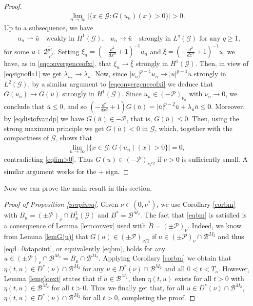 \documentclass[10pt,a4paper]{article}
\theoremstyle{definition} \theoremstyle{remark}
\numberwithin{equation}{section}
\newcommand{\G}{\mathcal{G}}
\newcommand{\B}{\mathcal{B}}
\newcommand{\p}{\mathcal{P}}
\newcommand{\la}{\lambda}
\begin{document}
\begin{proof}
    \begin{align} \label{eqlim>0}
    	\lim_{n \to \infty}|\{x \in \G: G(u_n)(x) > 0\}| > 0.
    \end{align}
    Up to a subsequence, we have 
    \begin{align*}
    	& u_n \rightharpoonup \bar u \quad \text{weakly in } H^1(\G), 
    	& u_n \to \bar u \quad \text{strongly in } L^q(\G) \text{ for any } q \geq 1,
    \end{align*}
    for some $\bar u \in \overline{\B_{\rho^*}^\mu}$. Setting $\xi_n = (-\frac{d^2}{dx^2} + 1)^{-1}u_n$ and $\bar\xi = (-\frac{d^2}{dx^2} + 1)^{-1}\bar u$,  we have, as in  \eqref{eqconvergenceofxi}, that $\xi_n \to \bar \xi$ strongly in $H^1(\G)$. Then, in view of \eqref{eqsignofla1} we get $\la_{u_n} \to \la_{\bar u}$. Now, since $|u_n|^{p-1}u_n \to |u|^{p-1}u$ strongly in $L^2(\G)$, by a similar argument to \eqref{eqconvergenceofxi} we deduce that $G(u_n) \to G(\bar u)$ strongly in $H^1(\G)$. Since $u_n \in (-\p)_{\nu_n}$ with $\nu_n \to 0$, we conclude that $\bar u \leq 0$, and so $(-\frac{d^2}{dx^2} + 1)G(\bar u) = |\bar u|^{p-2}\bar u + \la_{\bar u}\bar u \leq 0$. Moreover, by \eqref{eqdistofvandp} we have $G(\bar u) \in -\p$, that is, $ G(\bar u) \leq 0$. Then, using the strong maximum principle we get $G(\bar u) < 0$ in $\G$, which, together with the compactness of $\G$, shows that
    \begin{align*}
    	\lim_{n \to \infty}|\{x \in \G: G(u_n)(x) > 0\}| = 0,
    \end{align*}
    contradicting \eqref{eqlim>0}. Thus $G(u) \in (-\p)_{\nu/2}$ if $\nu > 0$ is sufficiently small. A similar argument works for the $+$ sign.
\end{proof}

Now we can prove the main result in this section.


\begin{proof}[Proof of Proposition \ref{propinva}]
Given $\nu \in (0,\nu^*)$, we use Corollary \ref{corbm} with $B_\mu = (\pm\p)_\nu \cap H^1_\mu(\G)$ and $B^* = \B^{M_2}$. The fact that \eqref{eqbm} is satisfied is a consequence of Lemma \ref{lemconvex} used with $\tilde{B} = (\pm\p)_\nu$. Indeed, we know from Lemma \ref{lemG(u)} that $G(u) \in (\pm\p)_{\nu/2}$ if $u \in (\pm\p)_\nu \cap \B^{M_2}$ and thus \eqref{eqd=0atapoint}, or equivalently \eqref{eqbm}, holds for any $u \in (\pm\p)_\nu \cap \B^{M_2} = B_{\mu} \cap \B^{M_2}.$  Applying Corollary \ref{corbm} we obtain that  $\eta(t,u) \in D^*(\nu) \cap \B^{M_2}$ for any $u \in D^*(\nu) \cap \B^{M_2}$ and all $0 < t <T_u$. However, Lemma \ref{lemgloext} states that if $u \in \B^{M_2}$, then $\eta(t,u)$ exists for all $t > 0$ with 
$\eta(t,u) \in \B^{M_2}$ for all $t > 0$. Thus we finally get that, for all $u \in D^*(\nu) \cap \B^{M_2}$,  $\eta(t,u) \in D^*(\nu) \cap \B^{M_2}$ for all $t>0$, completing the proof.
\end{proof}
\end{document}
